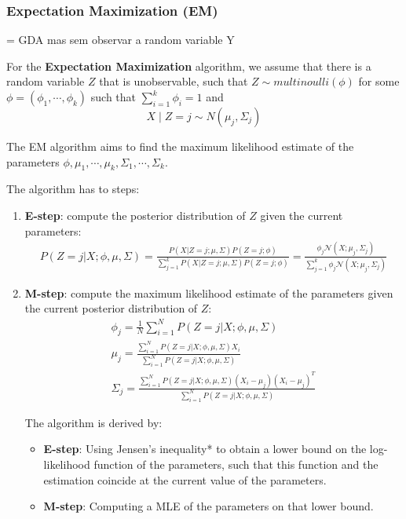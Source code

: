 \documentclass{article}
\begin{document}
\subsubsection{Expectation Maximization (EM)}

= GDA mas sem observar a random variable Y

For the \textbf{Expectation Maximization} algorithm, we assume that there is a random variable $Z$ that is unobservable, such that $Z \sim multinoulli(\phi)$ for some $\phi = (\phi_1, \cdots, \phi_k)$ such that $\sum_{i=1}^k \phi_i = 1$ and 
$$
X \mid Z = j \sim N(\mu_j, \Sigma_j)
$$

The EM algorithm aims to find the maximum likelihood estimate of the parameters $\phi, \mu_1, \cdots, \mu_k, \Sigma_1, \cdots, \Sigma_k$.

The algorithm has to steps:
\begin{enumerate}
\item \textbf{E-step}: compute the posterior distribution of $Z$ given the current parameters:
\begin{gather*}
P(Z = j | X ; \phi, \mu, \Sigma) =
\frac{P(X | Z = j ; \mu, \Sigma) P(Z = j ; \phi)}{\sum_{j=1}^k P(X | Z = j ; \mu, \Sigma) P(Z = j ; \phi)} = 
\frac{\phi_j \mathcal{N}(X ; \mu_j, \Sigma_j)}{\sum_{j=1}^k \phi_j \mathcal{N}(X ; \mu_j, \Sigma_j)}
\end{gather*}
\item \textbf{M-step}: compute the maximum likelihood estimate of the parameters given the current posterior distribution of $Z$:
\begin{gather*}
\phi_j = \frac{1}{N} \sum_{i=1}^N P(Z = j | X ; \phi, \mu, \Sigma) \\
\mu_j = \frac{\sum_{i=1}^N P(Z = j | X ; \phi, \mu, \Sigma) X_i}{\sum_{i=1}^N P(Z = j | X ; \phi, \mu, \Sigma)} \\
\Sigma_j = \frac{\sum_{i=1}^N P(Z = j | X ; \phi, \mu, \Sigma) (X_i - \mu_j)(X_i - \mu_j)^T}{\sum_{i=1}^N P(Z = j | X ; \phi, \mu, \Sigma)}
\end{gather*}

The algorithm is derived by:
\begin{itemize}
\item \textbf{E-step}: Using Jensen's inequality* to obtain a lower bound on the log-likelihood function of the parameters, such that this function and the estimation coincide at the current value of the parameters.
\item \textbf{M-step}: Computing a MLE of the parameters on that lower bound.
\end{itemize}


\end{enumerate}
\end{document}
